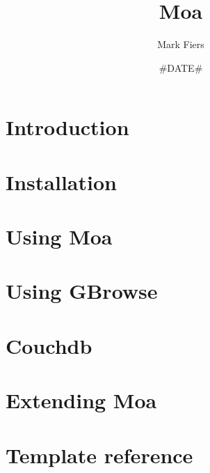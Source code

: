\documentclass[a4paper,11pt,oneside]{report}
\begin{document}

\title{Moa}
\author{Mark Fiers}
\date{#DATE#}

\begin{titlepage}
\vfill
{}
\vfill
\vfill
{}
\end{titlepage}
\tableofcontents

\chapter{Introduction\label{ch:introduction}}

\chapter{Installation\label{ch:installation}}

\chapter{Using Moa\label{ch:using}}

\chapter{Using GBrowse\label{ch:gbrowse}}

\chapter{Couchdb\label{ch:couchdb}}

\chapter{Extending Moa\label{ch:extending}}

\appendix
\chapter{Template reference\label{ch:templateref}}



\end{document}

